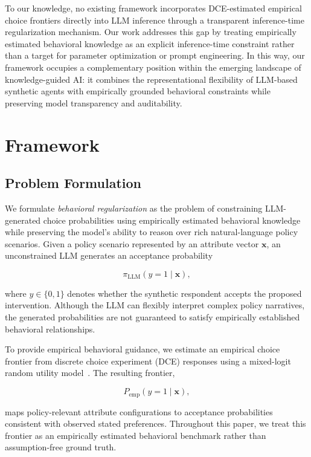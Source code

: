 \documentclass[11pt]{article}
\begin{document}
To our knowledge, no existing framework incorporates DCE-estimated empirical choice frontiers directly into LLM inference through a transparent inference-time regularization mechanism. Our work addresses this gap by treating empirically estimated behavioral knowledge as an explicit inference-time constraint rather than a target for parameter optimization or prompt engineering. In this way, our framework occupies a complementary position within the emerging landscape of knowledge-guided AI: it combines the representational flexibility of LLM-based synthetic agents with empirically grounded behavioral constraints while preserving model transparency and auditability.
\section{Framework}
\subsection{Problem Formulation}
\label{sec:problem_setup}

We formulate \textit{behavioral regularization} as the problem of constraining LLM-generated choice probabilities using empirically estimated behavioral knowledge while preserving the model's ability to reason over rich natural-language policy scenarios. Given a policy scenario represented by an attribute vector $\mathbf{x}$, an unconstrained LLM generates an acceptance probability

\begin{equation}
\pi_{\mathrm{LLM}}(y=1\mid\mathbf{x}),
\end{equation}

where $y\in\{0,1\}$ denotes whether the synthetic respondent accepts the proposed intervention. Although the LLM can flexibly interpret complex policy narratives, the generated probabilities are not guaranteed to satisfy empirically established behavioral relationships.

To provide empirical behavioral guidance, we estimate an empirical choice frontier from discrete choice experiment (DCE) responses using a mixed-logit random utility model~\citep{McFadden1974b,BenAkiva1985}. The resulting frontier,

\begin{equation}
P_{\mathrm{emp}}(y=1\mid\mathbf{x}),
\end{equation}

maps policy-relevant attribute configurations to acceptance probabilities consistent with observed stated preferences. Throughout this paper, we treat this frontier as an empirically estimated behavioral benchmark rather than assumption-free ground truth.
\end{document}
